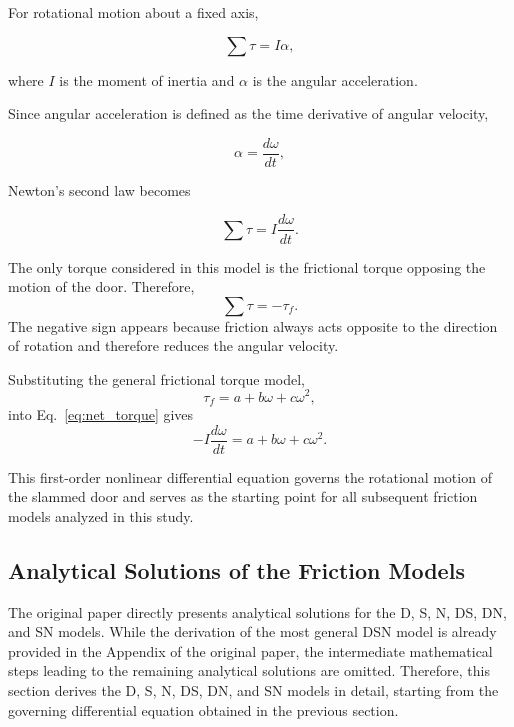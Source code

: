 \documentclass[11pt,letterpaper]{article}
\begin{document}
For rotational motion about a fixed axis,

\begin{equation}
\sum\tau = I\alpha,
\end{equation}

where $I$ is the moment of inertia and $\alpha$ is the angular acceleration.

Since angular acceleration is defined as the time derivative of angular velocity,

\begin{equation}
\alpha=\frac{d\omega}{dt},
\end{equation}

Newton's second law becomes

\begin{equation}
\sum\tau = I\frac{d\omega}{dt}.
\end{equation}

The only torque considered in this model is the frictional torque opposing the motion of the door. Therefore,
\begin{equation}\label{eq:net_torque}
\sum\tau = -\tau_f.
\end{equation}
The negative sign appears because friction always acts opposite to the direction of rotation and therefore reduces the angular velocity.

Substituting the general frictional torque model,
\begin{equation}\label{eq:f_torque}
\tau_f=a+b\omega+c\omega^2,
\end{equation}
into Eq.~\eqref{eq:net_torque} gives
\begin{equation}\label{eq:ode}
-I\frac{d\omega}{dt}
=
a+b\omega+c\omega^2.
\end{equation}

This first-order nonlinear differential equation governs the rotational motion of the slammed door and serves as the starting point for all subsequent friction models analyzed in this study.



\subsection{Analytical Solutions of the Friction Models}
The original paper directly presents analytical solutions for the D, S, N, DS, DN, and SN models. While the derivation of the most general DSN model is already provided in the Appendix of the original paper, the intermediate mathematical steps leading to the remaining analytical solutions are omitted. Therefore, this section derives the D, S, N, DS, DN, and SN models in detail, starting from the governing differential equation obtained in the previous section.
\end{document}
